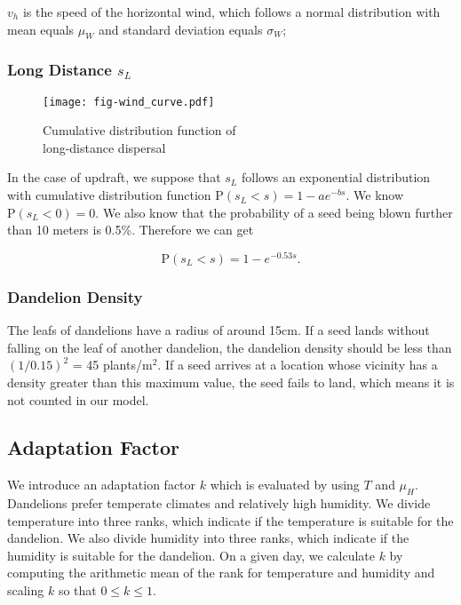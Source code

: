 \documentclass[12pt]{article}
\begin{document}
		$v_h$ is the speed of the horizontal wind, which follows a normal distribution with mean equals $\mu_W$ and standard deviation equals $\sigma_W$;

		\subsubsection{Long Distance $s_L$}
	
		\begin{wrapfigure}{r}{0.5\textwidth}
			\vspace{-1.5cm}
			\centering
			\texttt{[image: fig-wind\_curve.pdf]}
			\caption{Cumulative distribution function of\\long-distance dispersal}
			\label{fig:longDistance}
		\end{wrapfigure}
		
		In the case of updraft, we suppose that $s_L$ follows an exponential distribution\autocite{okubo1989theoretical} with cumulative distribution function $\mathrm{P} (s_L < s) = 1 - ae^{-bs}$.  We know $\mathrm{P} (s_L < 0) = 0$.  We also know that the probability of a seed being blown further than 10 meters is 0.5\%\autocite{tackenberg2003dandelion}.  Therefore we can get
		
		\begin{equation}\label{eq:updraft}
			\mathrm{P} (s_L < s) = 1 - e^{-0.53 s}.
		\end{equation}
		
		\newpage
		\subsubsection{Dandelion Density}
		
		The leafs of dandelions have a radius of around 15cm.  If a seed lands without falling on the leaf of another dandelion, the dandelion density should be less than $(1/0.15)^2$ = 45 plants/m$^2$.  If a seed arrives at a location whose vicinity has a density greater than this maximum value, the seed fails to land, which means it is not counted in our model.
		
		
		
		
		
	\subsection{Adaptation Factor}
	\label{sec:af}
		
			We introduce an adaptation factor $k$ which is evaluated by using $T$ and $\mu_H$.  Dandelions prefer temperate climates and relatively high humidity.  We divide temperature into three ranks, which indicate if the temperature is suitable for the dandelion.  We also divide humidity into three ranks, which indicate if the humidity is suitable for the dandelion.  On a given day, we calculate $k$ by computing the arithmetic mean of the rank for temperature and humidity and scaling $k$ so that $0 \leq k \leq 1$.
			
\end{document}
